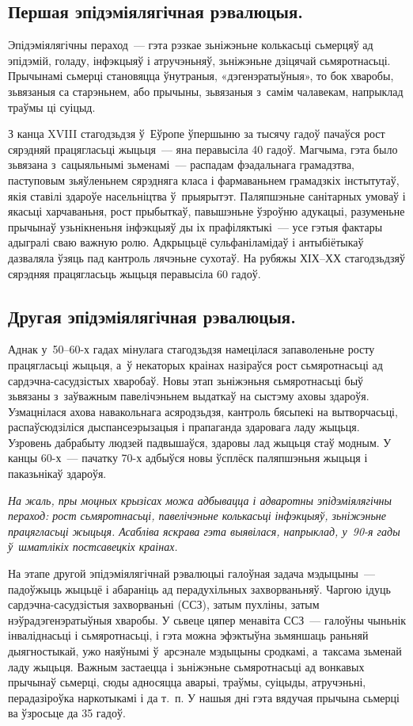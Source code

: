 \subsection*{Першая эпідэміялягічная рэвалюцыя.}

Эпідэміялягічны пераход~--- гэта рэзкае зьніжэньне колькасьці сьмерцяў ад эпідэмій, голаду, інфэкцыяў і атручэньняў, зьніжэньне дзіцячай сьмяротнасьці. Прычынамі сьмерці становяцца ўнутраныя, «дэгенэратыўныя», то бок хваробы, зьвязаныя са старэньнем, або прычыны, зьвязаныя з~самім чалавекам, напрыклад траўмы ці суіцыд.

З канца XVIII стагодзьдзя ў~Еўропе ўпершыню за тысячу гадоў пачаўся рост сярэдняй працягласьці жыцьця~--- яна перавысіла 40 гадоў. Магчыма, гэта было зьвязана з~сацыяльнымі зьменамі~--- распадам фэадальнага грамадзтва, паступовым зьяўленьнем сярэдняга класа і фармаваньнем грамадзкіх інстытутаў, якія ставілі здароўе насельніцтва ў~прыярытэт. Паляпшэньне санітарных умоваў і якасьці харчаваньня, рост прыбыткаў, павышэньне ўзроўню адукацыі, разуменьне прычынаў узьнікненьня інфэкцыяў ды іх прафіляктыкі~--- усе гэтыя фактары адыгралі сваю важную ролю. Адкрыцьцё сульфаніламідаў і антыбіётыкаў дазваляла ўзяць пад кантроль лячэньне сухотаў. На рубяжы ХІХ--ХХ стагодзьдзяў сярэдняя працягласьць жыцьця перавысіла 60 гадоў.

\subsection*{Другая эпідэміялягічная рэвалюцыя.}

Аднак у~50--60-х гадах мінулага стагодзьдзя намецілася запаволеньне росту працягласьці жыцьця, а~ў некаторых краінах назіраўся рост сьмяротнасьці ад сардэчна-сасудзістых хваробаў. Новы этап зьніжэньня сьмяротнасьці быў зьвязаны з~заўважным павелічэньнем выдаткаў на сыстэму аховы здароўя. Узмацнілася ахова навакольнага асяродзьдзя, кантроль бясьпекі на вытворчасьці, распаўсюдзіліся дыспансеэрызацыя і прапаганда здаровага ладу жыцьця. Узровень дабрабыту людзей падвышаўся, здаровы лад жыцьця стаў модным. У канцы 60-х~--- пачатку 70-х адбыўся новы ўсплёск паляпшэньня жыцьця і паказьнікаў здароўя.

\emph{На жаль, пры моцных крызісах можа адбывацца і адваротны эпідэміялягічны пераход: рост сьмяротнасьці, павелічэньне колькасьці інфэкцыяў, зьніжэньне працягласьці жыцьця. Асабліва яскрава гэта выявілася, напрыклад, у~90-я гады ў~шматлікіх постсавецкіх краінах.}

На этапе другой эпідэміялягічнай рэвалюцыі галоўная задача мэдыцыны~--- падоўжыць жыцьцё і абараніць ад перадухільных захворваньняў. Чаргою ідуць сардэчна-сасудзістыя захворваньні (ССЗ), затым пухліны, затым нэўрадэгенэратыўныя хваробы. У сьвеце цяпер менавіта ССЗ~--- галоўны чыньнік інваліднасьці і сьмяротнасьці, і гэта можна эфэктыўна зьмяншаць раньняй дыягностыкай, ужо наяўнымі ў~арсэнале мэдыцыны сродкамі, а~таксама зьменай ладу жыцьця. Важным застаецца і зьніжэньне сьмяротнасьці ад вонкавых прычынаў сьмерці, сюды адносяцца аварыі, траўмы, суіцыды, атручэньні, перадазіроўка наркотыкамі і да т.~п. У нашыя дні гэта вядучая прычына сьмерці ва ўзросьце да 35 гадоў.

